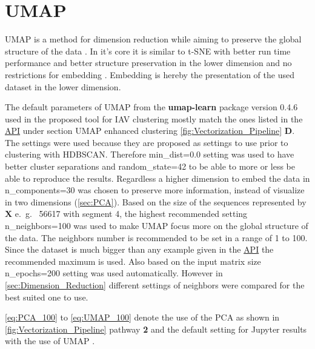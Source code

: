 \section{UMAP} \label{sec:UMAP}

\gls{UMAP} is a method for dimension reduction while aiming to preserve the global structure of the data \autocite{mcinnes_umap_2020}. In it's core it is similar to \gls{t-SNE} with better run time performance and better structure preservation in the lower dimension and no restrictions for embedding \autocite{mcinnes_umap_2020, maaten_visualizing_2008}. Embedding is hereby the presentation of the used dataset in the lower dimension.

The default parameters of \gls{UMAP} from the \textbf{umap-learn} package version 0.4.6 used in the proposed tool for \gls{IAV} clustering mostly match the ones listed in the \href{https://umap-learn.readthedocs.io/en/latest/api.html}{API} under section \glqq \gls{UMAP} enhanced clustering\grqq{} \autoref{fig:Vectorization_Pipeline} \textsf{\textbf{D}}. The settings were used because they are proposed as settings to use prior to clustering with \gls{HDBSCAN}. Therefore \colorbox{backcolour}{min\_dist=0.0} setting was used to have better cluster separations and \colorbox{backcolour}{random\_state=42} to be able to more or less be able to reproduce the results. Regardless a higher dimension to embed the data in \colorbox{backcolour}{n\_components=30} was chosen to preserve more information, instead of visualize in two dimensions (\autoref{sec:PCA}). Based on the size of the sequences represented by $\mathbf{X}$ e.~g.~ 56617 with segment 4, the highest recommended setting \colorbox{backcolour}{n\_neighbors=100} was used to make \gls{UMAP} focus more on the global structure of the data. The neighbors number is recommended to be set in a range of 1 to 100. Since the dataset is much bigger than any example given in the \href{https://umap-learn.readthedocs.io/en/latest/api.html}{API} the recommended maximum is used. Also based on the input matrix size \colorbox{backcolour}{n\_epochs=200} setting was used automatically. However in \autoref{sec:Dimension_Reduction} different settings of neighbors were compared for the best suited one to use.

\autoref{eq:PCA_100} to \autoref{eq:UMAP_100} denote the use of the \gls{PCA} as shown in \autoref{fig:Vectorization_Pipeline} pathway \textsf{\textbf{2}} and the default setting for Jupyter results with the use of \gls{UMAP} \autocite{kluyver_jupyter_2016, mcinnes_umap_2020, pedregosa_scikit-learn_2011, jolliffe_principal_2016}.

